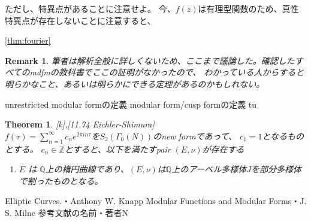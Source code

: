 \documentclass{ujarticle}
\newtheorem{thm}{Theorem}[section]
\newtheorem*{rem}{Remark}
\begin{document}
ただし、特異点があることに注意せよ。
今、$f(z)$は有理型関数のため、真性特異点が存在しないことに注意すると、

\ref{thm:fourier}


\begin{rem}
  筆者は解析全般に詳しくないため、ここまで議論した。確認したすべてのmdfmの教科書でここの証明がなかったので、
  わかっている人からすると明らかなこと、あるいは明らかにできる定理があるのかもしれない。
\end{rem}

unrestricted modular formの定義
modular form/cusp formの定義
tu


\begin{thm}{[k],[11.74 Eichler-Shimura]} \\
  $f(\tau)=\sum_{n=1}^{\infty}c_ne^{2 \pi i n \tau}$を$S_2(\Gamma_0(N))$のnew formであって、
  $c_1=1$となるものとする。 $c_n \in \mathbb{Z}$とすると、以下を満たすpair $(E, \nu)$が存在する
  \begin{enumerate}
    \item $E$ は $\mathbb{Q}$上の楕円曲線であり、$(E, \nu)$は$\mathbb{Q}$上のアーベル多様体$J$を部分多様体で割ったものとなる。
  \end{enumerate}

\end{thm}


\begin{thebibliography}{数字}
   Elliptic Curves.・Anthony W. Knapp
   Modular Functions and Modular Forms・J. S. Milne
   参考文献の名前・著者N
\end{thebibliography}
\end{document}
